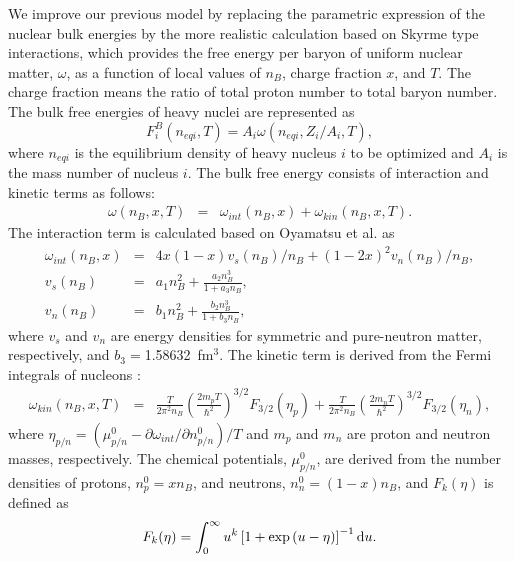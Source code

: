 \documentclass[preprint]{revtex4}
\begin{document}
We improve our previous model by replacing the parametric expression of the nuclear bulk energies by  the more realistic calculation based on Skyrme type interactions, which  %
 provides the free energy per baryon of uniform nuclear matter, $\omega$, as a function of local values of  $n_B$, charge fraction $x$, and $T$. The charge fraction means  the  ratio of total proton number to total  baryon number.
The bulk free energies of heavy nuclei are represented as
\begin{equation} \label{eq:bulk}
F_{i}^{B}(n_{eqi},T) = A_i \omega(n_{eqi},Z_i/A_i,T)    , %
\end{equation}
where $n_{eqi}$ is the equilibrium density of  heavy nucleus $i$ to be optimized and 
 $A_{i}$ is the mass number of nucleus $i$.
The bulk  free energy consists of interaction and  kinetic  terms as follows:
\begin{eqnarray}%
 \label{eq:para1}
 \omega(n_B,x,T) &= & \omega_{int}(n_B,x)  + \omega_{kin}(n_B,x,T) .
\end{eqnarray}
%
The interaction term is calculated based on Oyamatsu et al. \cite{oyamatsu03} as
\begin{eqnarray}%
 \label{eq:paraint}
\omega_{int}(n_B,x) &=&  4 x(1-x) v_s(n_B) /n_B + (1-2 x)^2 v_n(n_B) /n_B  ,\\
v_s(n_B) & = &a_1 n_B^2 + \frac{a_2 n_B^3}{1+a_3 n_B}   , \\
v_n(n_B) & = &b_1 n_B^2 + \frac{b_2 n_B^3}{1+b_3 n_B},
\end{eqnarray}
where  $v_s$ and $v_n$ are energy densities for symmetric and pure-neutron matter, respectively, and $b_3=$1.58632~fm$^3$.  
The kinetic term is derived from the Fermi integrals of nucleons \cite{lattimer91}:
\begin{eqnarray}%
 \label{eq:parakine}
\omega_{kin}(n_B,x,T) &=& \frac{T}{2 \pi^2 n_B}  \left(\frac{2m_pT}{\hbar^2} \right)^{3/2}  F_{3/2} (\eta_p) +   \frac{T}{2 \pi^2 n_B}  \left( \frac{2m_nT}{\hbar^2} \right)^{3/2}  F_{3/2} (\eta_n)  ,
\end{eqnarray}
where $\eta_{p/n}=\left( \mu^0_{p/n} - \partial \omega_{int}/ \partial n^0_{p/n} \right)/T $ and
$m_p$ and $m_n$ are proton and neutron masses, respectively.
The chemical potentials, $\mu^0_{p/n}$, are derived from the number densities of protons, $n^0_p=x n_B$,  and neutrons, $n^0_n=(1-x) n_B$,   
and $F_{k}(\eta)$  is defined as 
\begin{eqnarray}%
 \label{eq:gfd}
F_{k}(\eta)=\int_0^{\infty} u^{k} \left[ 1+\exp{(u-\eta)} \right]^{-1} {\rm d} u .
\end{eqnarray}
\end{document}
